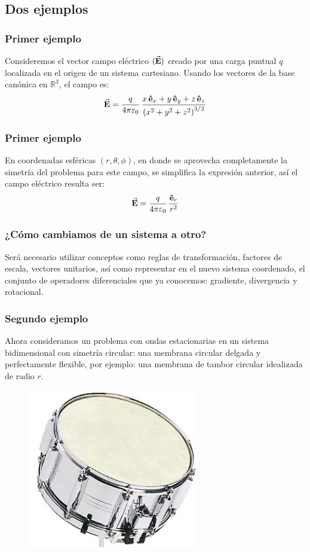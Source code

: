 \documentclass[12pt]{beamer}
\begin{document}
\subsection{Dos ejemplos}
\begin{frame}
\frametitle{Primer ejemplo}
Consideremos el vector campo eléctrico $(\va{E})$ creado por una carga puntual $q$ localizada en el origen de un sistema cartesiano. \pause Usando los vectores de la base canónica en $\mathbb{R}^{3}$, el campo es:
\pause
\begin{align*}
\va{E} = \dfrac{q}{4 \pi \varepsilon_{0}} \, \dfrac{x \, \vu{e}_{x} + y \, \vu{e}_{y} + z \, \vu{e}_{z}}{\left( x^{2} + y^{2} + z^{2} \right)^{3/2}}
\end{align*}
\end{frame}
\begin{frame}
\frametitle{Primer ejemplo}
En coordenadas esféricas $(r, \theta, \phi)$, en donde se aprovecha completamente la simetría del problema para este campo, se simplifica la expresión anterior, \pause así el campo eléctrico resulta ser:
\begin{align*}
\va{\vb{E}} = \dfrac{q}{4 \pi \varepsilon_{0}} \, \dfrac{\vu{e}_{r}}{r^{2}}
\end{align*}
\end{frame}
\begin{frame}
\frametitle{¿Cómo cambiamos de un sistema a otro?}
Será necesario utilizar conceptos como reglas de transformación, factores de escala, vectores unitarios, así como representar en el nuevo sistema coordenado, el conjunto de operadores diferenciales que ya conocemos: gradiente, divergencia y rotacional.
\end{frame}
\begin{frame}
\frametitle{Segundo ejemplo}
Ahora consideramos un problema con ondas estacionarias en un sistema bidimensional con simetría circular: una membrana circular delgada y perfectamente flexible, por ejemplo: una membrana de tambor circular idealizada de radio $r$.
\pause
\begin{figure}[H]
  \centering
  \includegraphics[scale=0.75]{Imagenes/Tambor.png}
\end{figure}
\end{frame}
\end{document}
